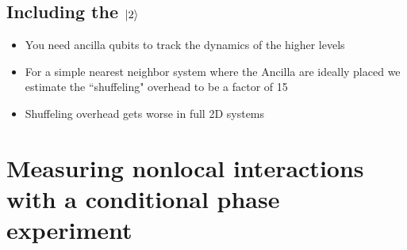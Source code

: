 \documentclass{article}
\begin{document}
\subsection{Including the $\ket{2}$ }
\begin{itemize}
    \item You need ancilla qubits to track the dynamics of the higher levels
    \item For a simple nearest neighbor system where the Ancilla are ideally placed we estimate the ``shuffeling" overhead to be a factor of 15
    \item Shuffeling overhead gets worse in full 2D systems
\end{itemize}






\section{Measuring nonlocal interactions with a conditional phase experiment}
\end{document}
